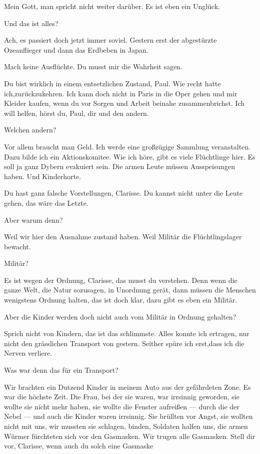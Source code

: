 \documentclass[
	final,
	a4paper,
	ngerman,
	mpinclude = true, %
	twoside = true,
	open = right,
	cleardoublepage = plain,
	DIV = 13,
	BCOR = 1cm,
	titlepage = firstiscover,
	]{scrbook}
\newcommand{\thecharacter}[1]{\textup{\textsc{#1}}\xspace}
\newcommand{\theClarisse}{\thecharacter{Clarisse}}
\newcommand{\character}[1]{\item[#1]}
\newcommand{\Generaldirektor}{\character{Direktor}}
\newcommand{\Clarisse}{\character{\theClarisse}}
\begin{document}
\begin{play}
\Clarisse
Mein Gott, man spricht nicht weiter darüber. Es ist eben ein Unglück.

\Generaldirektor
Und das ist alles?

\Clarisse
Ach, es passiert doch jetzt immer soviel. Gestern erst der abgestürzte Ozeanflieger und dann das Erdbeben in Japan.

\Generaldirektor
Mach keine Ausflüchte. Du musst mir die Wahrheit sagen.

\Clarisse
Du bist wirklich in einem entsetzlichen Zustand, Paul. Wie recht hatte ich,zurückzukehren. Ich kann doch nicht in Paris in die Oper gehen und mir Kleider kaufen, wenn du vor Sorgen und Arbeit beinahe zusammenbrichst. Ich will helfen, hörst du, Paul, dir und den andern.

\Generaldirektor
Welchen andern?

\Clarisse
Vor allem braucht man Geld. Ich werde eine großzügige Sammlung veranstalten. Dazu bilde ich ein Aktionskomitee. Wie ich höre, gibt es viele Flüchtlinge hier. Es soll ja ganz Dybern evakuiert sein. Die armen Leute müssen Ausspeisungen haben. Und Kinderhorte.

\Generaldirektor
Du hast ganz falsche Vorstellungen, Clarisse. Du kannst nicht unter die Leute gehen, das wäre das Letzte.

\Clarisse
Aber warum denn?

\Generaldirektor
Weil wir hier den Ausnahme zustand haben. Weil Militär die Flüchtlingslager bewacht.

\Clarisse
Militär?

\Generaldirektor
Es ist wegen der Ordnung, Clarisse, das musst du verstehen. Denn wenn die ganze Welt, die Natur sozusagen, in Unordnung gerät, dann müssen die Menschen wenigstens Ordnung halten, das ist doch klar, dazu gibt es eben ein Militär.

\Clarisse
Aber die Kinder werden doch nicht auch vom Militär in Ordnung gehalten?

\Generaldirektor
Sprich nicht von Kindern, das ist das schlimmste. Alles konnte ich ertragen, nur nicht den grässlichen Transport von gestern. Seither spüre ich erst,dass ich die Nerven verliere.

\Clarisse
Was war denn das für ein Transport?

\Generaldirektor
Wir brachten ein Dutzend Kinder in meinem Auto aus der gefährdeten Zone. Es war die höchste Zeit. Die Frau, bei der sie waren, war irrsinnig geworden, sie wollte sie nicht mehr haben, sie wollte die Fenster aufreißen --- durch die der Nebel --- und auch die Kinder waren irrsinnig. Sie brüllten vor Angst, sie wollten nicht mit uns, wir mussten sie schlagen, binden, Soldaten halfen uns, die armen Würmer fürchteten sich vor den Gasmasken. Wir trugen alle Gasmasken. Stell dir vor, Clarisse, wenn auch du solch eine Gasmaske


\end{play}
\end{document}

